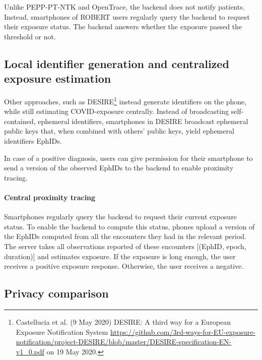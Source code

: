 \documentclass{article}
\begin{document}
Unlike PEPP-PT-NTK and OpenTrace, the backend does not notify patients.
Instead, smartphones of ROBERT users regularly query the backend to
request their exposure status. The backend answers whether the exposure
passed the threshold or not.

\hypertarget{local-identifier-generation-and-centralized-exposure-estimation}{%
\subsection{Local identifier generation and centralized exposure
estimation}\label{local-identifier-generation-and-centralized-exposure-estimation}}

Other approaches, such as DESIRE\footnote{Castellucia et al. (9 May
  2020) DESIRE: A third way for a European Exposure Notification System
  \href{https://github.com/3rd-ways-for-EU-exposure-notification/project-DESIRE/blob/master/DESIRE-specification-EN-v1_0.pdf}{{https://github.com/3rd-ways-for-EU-exposure-notification/project-DESIRE/blob/master/DESIRE-specification-EN-v1\_0.pdf}}
  on 19 May 2020.} instead generate identifiers on the phone, while
still estimating COVID-exposure centrally. Instead of broadcasting
self-contained, ephemeral identifiers, smartphones in DESIRE broadcast
ephemeral public keys that, when combined with others' public keys,
yield ephemeral identifiers EphIDs.

In case of a positive diagnosis, users can give permission for their
smartphone to send a version of the observed EphIDs to the backend to
enable proximity tracing.

\hypertarget{central-proximity-tracing-1}{%
\paragraph{Central proximity
tracing}\label{central-proximity-tracing-1}}

Smartphones regularly query the backend to request their current
exposure status. To enable the backend to compute this status, phones
upload a version of the EphIDs computed from all the encounters they had
in the relevant period. The server takes all observations reported of
these encounters {[}(EphID, epoch, duration){]} and estimates exposure.
If the exposure is long enough, the user receives a positive exposure
response. Otherwise, the user receives a negative.


\subsection{Privacy comparison}\label{privacy-comparison}
\end{document}
